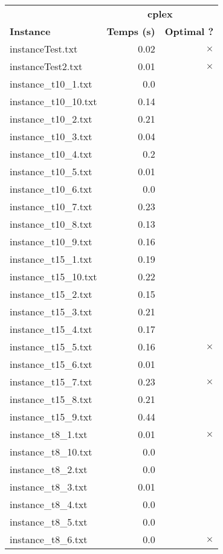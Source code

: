 \documentclass{article}
\begin{document}
\begin{center}
\renewcommand{\arraystretch}{1.4} 
 \begin{tabular}{lrr}
	\hline
 & \multicolumn{2}{c}{\textbf{cplex}}\\
\textbf{Instance}  & \textbf{Temps (s)} & \textbf{Optimal ?} \\\hline

instanceTest.txt & 0.02 & 
$\times$
\\
instanceTest2.txt & 0.01 & 
$\times$
\\
instance\_t10\_1.txt & 0.0 & 
\\
instance\_t10\_10.txt & 0.14 & 
\\
instance\_t10\_2.txt & 0.21 & 
\\
instance\_t10\_3.txt & 0.04 & 
\\
instance\_t10\_4.txt & 0.2 & 
\\
instance\_t10\_5.txt & 0.01 & 
\\
instance\_t10\_6.txt & 0.0 & 
\\
instance\_t10\_7.txt & 0.23 & 
\\
instance\_t10\_8.txt & 0.13 & 
\\
instance\_t10\_9.txt & 0.16 & 
\\
instance\_t15\_1.txt & 0.19 & 
\\
instance\_t15\_10.txt & 0.22 & 
\\
instance\_t15\_2.txt & 0.15 & 
\\
instance\_t15\_3.txt & 0.21 & 
\\
instance\_t15\_4.txt & 0.17 & 
\\
instance\_t15\_5.txt & 0.16 & 
$\times$
\\
instance\_t15\_6.txt & 0.01 & 
\\
instance\_t15\_7.txt & 0.23 & 
$\times$
\\
instance\_t15\_8.txt & 0.21 & 
\\
instance\_t15\_9.txt & 0.44 & 
\\
instance\_t8\_1.txt & 0.01 & 
$\times$
\\
instance\_t8\_10.txt & 0.0 & 
\\
instance\_t8\_2.txt & 0.0 & 
\\
instance\_t8\_3.txt & 0.01 & 
\\
instance\_t8\_4.txt & 0.0 & 
\\
instance\_t8\_5.txt & 0.0 & 
\\
instance\_t8\_6.txt & 0.0 & 
$\times$
\\
\hline\end{tabular}
\end{center}
\end{document}
